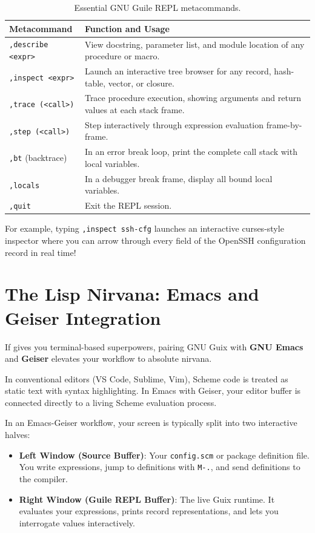 \begin{table}[htbp]
\centering
\small
\begin{tabularx}{\textwidth}{L{0.28\textwidth} Y}
\toprule
\textbf{Metacommand} & \textbf{Function and Usage} \\
\midrule
\texttt{,describe <expr>} & View docstring, parameter list, and module location of any procedure or macro. \\
\texttt{,inspect <expr>} & Launch an interactive tree browser for any record, hash-table, vector, or closure. \\
\texttt{,trace (<call>)} & Trace procedure execution, showing arguments and return values at each stack frame. \\
\texttt{,step (<call>)} & Step interactively through expression evaluation frame-by-frame. \\
\texttt{,bt} (backtrace) & In an error break loop, print the complete call stack with local variables. \\
\texttt{,locals} & In a debugger break frame, display all bound local variables. \\
\texttt{,quit} & Exit the REPL session. \\
\bottomrule
\end{tabularx}
\caption{Essential GNU Guile REPL metacommands.}
\end{table}

For example, typing \texttt{,inspect ssh-cfg} launches an interactive curses-style inspector where you can arrow through every field of the OpenSSH configuration record in real time!

\section{The Lisp Nirvana: Emacs and Geiser Integration}

If  gives you terminal-based superpowers, pairing GNU Guix with \textbf{GNU Emacs} and \textbf{Geiser} elevates your workflow to absolute nirvana.

In conventional editors (VS Code, Sublime, Vim), Scheme code is treated as static text with syntax highlighting. In Emacs with Geiser, your editor buffer is connected directly to a living Scheme evaluation process.

\begin{protipbox}
In an Emacs-Geiser workflow, your screen is typically split into two interactive halves:
\begin{itemize}
  \item \textbf{Left Window (Source Buffer)}: Your \texttt{config.scm} or package definition file. You write expressions, jump to definitions with \texttt{M-.}, and send definitions to the compiler.
  \item \textbf{Right Window (Guile REPL Buffer)}: The live Guix runtime. It evaluates your expressions, prints record representations, and lets you interrogate values interactively.
\end{itemize}
\end{protipbox}


